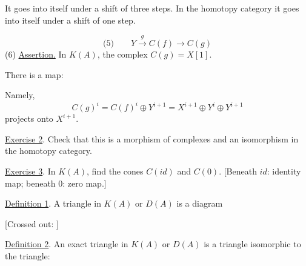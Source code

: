 It goes into itself under a shift of three steps.
In the homotopy category it goes into itself under a shift of one step.

\begin{equation*}
\text{(5)}\qquad Y\overset{g}{\longrightarrow}C(f)\longrightarrow C(g)
\end{equation*}
(6) \underline{Assertion.} In $K(A)$, the complex $C(g)=X[1]$.

There is a map:

Namely,
\begin{equation*}
C(g)^i=C(f)^i\oplus Y^{i+1}=X^{i+1}\oplus Y^i\oplus Y^{i+1}
\end{equation*}
projects onto $X^{i+1}$.


\underline{Exercise 2}. Check that this is a morphism of complexes and
an isomorphism in the homotopy category.

\underline{Exercise 3}. In $K(A)$, find the cones $C(id)$ and $C(0)$.
[Beneath $id$: identity map; beneath $0$: zero map.]

\underline{Definition 1}. A triangle in $K(A)$ or $D(A)$ is
a diagram
\begin{center}
\end{center}

[Crossed out: ]



\underline{\underline{Definition 2}}. An exact triangle in $K(A)$ or $D(A)$ is
a triangle isomorphic to the triangle:
\begin{center}
\end{center}


